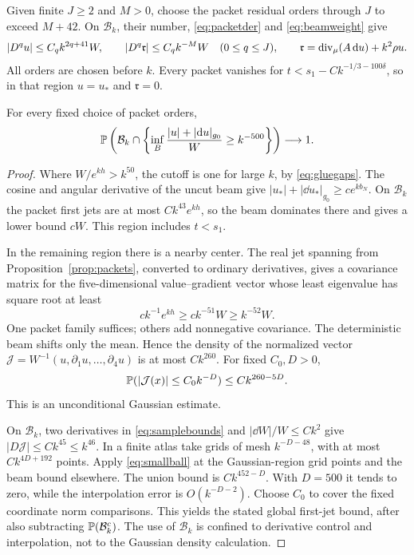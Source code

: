 Given finite \(J\ge2\) and \(M>0\), choose the packet residual
orders through \(J\) to exceed \(M+42\). On \(\mathcal B_k\),
their number, \eqref{eq:packetder} and \eqref{eq:beamweight} give
\begin{equation}\label{eq:samplebounds}
 |D^q u|\le C_qk^{2q+41}W,\qquad
 |D^q\mathfrak r|\le C_qk^{-M}W\quad(0\le q\le J),\qquad
 \mathfrak r=\operatorname{div}_\mu(A\,\mathrm d u)+k^2\rho u.
\end{equation}
All orders are chosen before \(k\).
Every packet vanishes for
\(t<s_1-Ck^{-1/3-100\delta}\), so in that region \(u=u_*\)
and \(\mathfrak r=0\).

\begin{lemma}\label{lem:jet}
For every fixed choice of packet orders,
\[
 \mathbb P\left(\mathcal B_k\cap
   \left\{\inf_B\frac{|u|+|\mathrm d u|_{g_0}}{W}\ge k^{-500}\right\}\right)
 \longrightarrow1 .
\]
\end{lemma}

\begin{proof}
Where \(W/e^{kh}>k^{50}\), the cutoff is one for large \(k\),
by \eqref{eq:gluegaps}. The cosine and angular derivative of
the uncut beam give
\(|u_*|+|\dd u_*|_{g_0}\ge ce^{kb_N}\).
On \(\mathcal B_k\) the packet first jets are at most
\(Ck^{43}e^{kh}\), so the beam dominates there and gives a
lower bound \(cW\). This region includes \(t<s_1\).

In the remaining region there is a nearby center. The real
jet spanning from Proposition~\ref{prop:packets}, converted
to ordinary derivatives, gives a covariance matrix for the
five-dimensional value--gradient vector whose least eigenvalue
has square root at least
\[
 ck^{-1}e^{kh}\ge ck^{-51}W\ge k^{-52}W.
\]
One packet family suffices; others add nonnegative covariance.
The deterministic beam shifts only the mean.
Hence the density of the normalized vector
\(\mathcal J=W^{-1}(u,\partial_1u,\ldots,\partial_4u)\)
is at most \(Ck^{260}\). For fixed \(C_0,D>0\),
\begin{equation}\label{eq:smallball}
 \mathbb P(|\mathcal J(x)|\le C_0k^{-D})\le Ck^{260-5D}.
\end{equation}
This is an unconditional Gaussian estimate.

On \(\mathcal B_k\), two derivatives in
\eqref{eq:samplebounds} and \(|\dd W|/W\le Ck^2\) give
\(|D\mathcal J|\le Ck^{45}\le k^{46}\).
In a finite atlas take grids of mesh \(k^{-D-48}\), with
at most \(Ck^{4D+192}\) points. Apply \eqref{eq:smallball}
at the Gaussian-region grid points and the beam bound elsewhere.
The union bound is \(Ck^{452-D}\). With \(D=500\) it tends
to zero, while the interpolation error is \(O(k^{-D-2})\).
Choose \(C_0\) to cover the fixed coordinate norm comparisons.
This yields the stated global first-jet bound, after also
subtracting \(\mathbb P(\mathcal B_k^c)\).
The use of \(\mathcal B_k\) is confined to derivative control
and interpolation, not to the Gaussian density calculation.
\end{proof}

